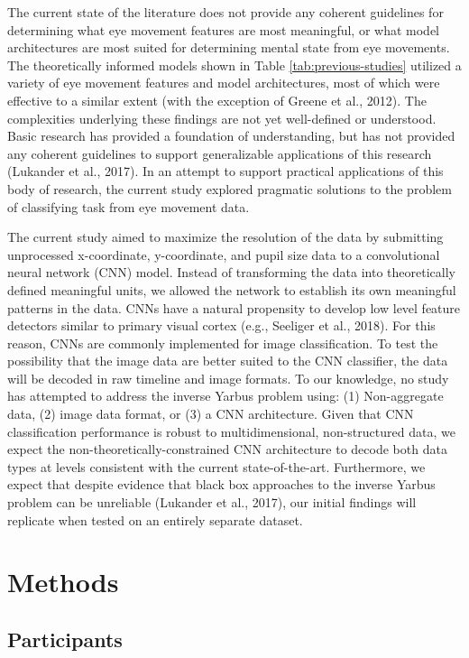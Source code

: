 \documentclass[
  english,
  man,floatsintext]{apa6}
\begin{document}
The current state of the literature does not provide any coherent guidelines for determining what eye movement features are most meaningful, or what model architectures are most suited for determining mental state from eye movements. The theoretically informed models shown in Table \ref{tab:previous-studies} utilized a variety of eye movement features and model architectures, most of which were effective to a similar extent (with the exception of Greene et al., 2012). The complexities underlying these findings are not yet well-defined or understood. Basic research has provided a foundation of understanding, but has not provided any coherent guidelines to support generalizable applications of this research (Lukander et al., 2017). In an attempt to support practical applications of this body of research, the current study explored pragmatic solutions to the problem of classifying task from eye movement data.

The current study aimed to maximize the resolution of the data by submitting unprocessed x-coordinate, y-coordinate, and pupil size data to a convolutional neural network (CNN) model. Instead of transforming the data into theoretically defined meaningful units, we allowed the network to establish its own meaningful patterns in the data. CNNs have a natural propensity to develop low level feature detectors similar to primary visual cortex (e.g., Seeliger et al., 2018). For this reason, CNNs are commonly implemented for image classification. To test the possibility that the image data are better suited to the CNN classifier, the data will be decoded in raw timeline and image formats. To our knowledge, no study has attempted to address the inverse Yarbus problem using: (1) Non-aggregate data, (2) image data format, or (3) a CNN architecture. Given that CNN classification performance is robust to multidimensional, non-structured data, we expect the non-theoretically-constrained CNN architecture to decode both data types at levels consistent with the current state-of-the-art. Furthermore, we expect that despite evidence that black box approaches to the inverse Yarbus problem can be unreliable (Lukander et al., 2017), our initial findings will replicate when tested on an entirely separate dataset.

\section{Methods}

\subsection{Participants}
\end{document}
